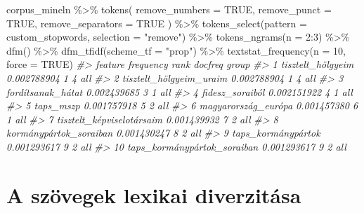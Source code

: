 \documentclass[
]{book}
\newenvironment{Shaded}{\begin{snugshade}}{\end{snugshade}}
\newcommand{\AttributeTok}[1]{\textcolor[rgb]{0.77,0.63,0.00}{#1}}
\newcommand{\CommentTok}[1]{\textcolor[rgb]{0.56,0.35,0.01}{\textit{#1}}}
\newcommand{\ConstantTok}[1]{\textcolor[rgb]{0.00,0.00,0.00}{#1}}
\newcommand{\DecValTok}[1]{\textcolor[rgb]{0.00,0.00,0.81}{#1}}
\newcommand{\FunctionTok}[1]{\textcolor[rgb]{0.00,0.00,0.00}{#1}}
\newcommand{\NormalTok}[1]{#1}
\newcommand{\SpecialCharTok}[1]{\textcolor[rgb]{0.00,0.00,0.00}{#1}}
\newcommand{\StringTok}[1]{\textcolor[rgb]{0.31,0.60,0.02}{#1}}
\begin{document}
\begin{Shaded}
\begin{Highlighting}[]

\NormalTok{corpus\_mineln }\SpecialCharTok{\%\textgreater{}\%}
  \FunctionTok{tokens}\NormalTok{(}
    \AttributeTok{remove\_numbers =} \ConstantTok{TRUE}\NormalTok{, }
    \AttributeTok{remove\_punct =} \ConstantTok{TRUE}\NormalTok{, }
    \AttributeTok{remove\_separators =} \ConstantTok{TRUE}
\NormalTok{    ) }\SpecialCharTok{\%\textgreater{}\%}
  \FunctionTok{tokens\_select}\NormalTok{(}\AttributeTok{pattern =}\NormalTok{ custom\_stopwords, }\AttributeTok{selection =} \StringTok{"remove"}\NormalTok{) }\SpecialCharTok{\%\textgreater{}\%}
  \FunctionTok{tokens\_ngrams}\NormalTok{(}\AttributeTok{n =} \DecValTok{2}\SpecialCharTok{:}\DecValTok{3}\NormalTok{) }\SpecialCharTok{\%\textgreater{}\%}
  \FunctionTok{dfm}\NormalTok{() }\SpecialCharTok{\%\textgreater{}\%}
  \FunctionTok{dfm\_tfidf}\NormalTok{(}\AttributeTok{scheme\_tf =} \StringTok{"prop"}\NormalTok{) }\SpecialCharTok{\%\textgreater{}\%}
  \FunctionTok{textstat\_frequency}\NormalTok{(}\AttributeTok{n =} \DecValTok{10}\NormalTok{, }\AttributeTok{force =} \ConstantTok{TRUE}\NormalTok{)}
\CommentTok{\#\textgreater{}                        feature   frequency rank docfreq group}
\CommentTok{\#\textgreater{} 1            tisztelt\_hölgyeim 0.002788904    1       4   all}
\CommentTok{\#\textgreater{} 2      tisztelt\_hölgyeim\_uraim 0.002788904    1       4   all}
\CommentTok{\#\textgreater{} 3            fordítsanak\_hátat 0.002439685    3       1   all}
\CommentTok{\#\textgreater{} 4              fidesz\_soraiból 0.002151922    4       1   all}
\CommentTok{\#\textgreater{} 5                    taps\_mszp 0.001757918    5       2   all}
\CommentTok{\#\textgreater{} 6          magyarország\_európa 0.001457380    6       1   all}
\CommentTok{\#\textgreater{} 7    tisztelt\_képviselotársaim 0.001439932    7       2   all}
\CommentTok{\#\textgreater{} 8       kormánypártok\_soraiban 0.001430247    8       2   all}
\CommentTok{\#\textgreater{} 9           taps\_kormánypártok 0.001293617    9       2   all}
\CommentTok{\#\textgreater{} 10 taps\_kormánypártok\_soraiban 0.001293617    9       2   all}
\end{Highlighting}
\end{Shaded}

\hypertarget{a-szuxf6vegek-lexikai-diverzituxe1sa}{%
\section{A szövegek lexikai
diverzitása}\label{a-szuxf6vegek-lexikai-diverzituxe1sa}}
\end{document}
